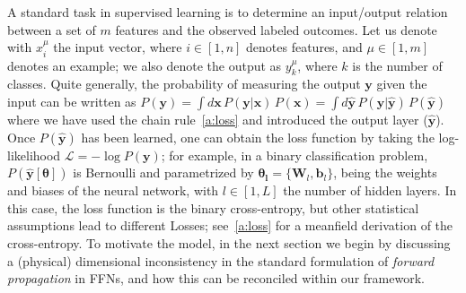 \documentclass{article}
\begin{document}
A standard task in supervised learning is to determine an input/output relation between a set of $m$ features and the observed labeled outcomes. Let us denote with $x^{\mu}_i$ the input vector, where $i \in [1, n]$ denotes features, and $\mu \in [1,m]$ denotes an example; we also denote the output as $y^{\mu}_k$, where $k$ is the number of classes. Quite generally, the probability of measuring the output $\mathbf{y}$ given the input can be written as $P(\mathbf{y}) = \int d\mathbf{x} \, P(\mathbf{y} | \mathbf{x}) \, P(\mathbf{x})  =  \int d \hat{\mathbf{y}} \, P(\mathbf{y} | \hat{\mathbf{y}} ) \, P(\hat{\mathbf{y}})$ where we have used the chain rule~\eqref{a:loss} and introduced the output layer ($\hat{ \mathbf{y}}$). Once $P(\hat{\mathbf{y}})$ has been learned, one can obtain the loss function by taking the log-likelihood $\mathscr{L} = - \log P(\mathbf{y})$; for example, in a binary classification problem, $P(\hat{\mathbf{y}}[\boldsymbol{\theta}])$ is Bernoulli and parametrized by $\boldsymbol{\theta_l} = \{\mathbf{W}_l,\mathbf{ b}_l \}$, being the weights and biases of the neural network, with $l \in [1, L]$ the number of hidden layers. In this case, the loss function is the binary cross-entropy, but other statistical assumptions lead to different Losses; see~\eqref{a:loss} for a meanfield derivation of the cross-entropy. To motivate the model, in the next section we begin by discussing a (physical) dimensional inconsistency in the standard formulation of {\it forward propagation} in FFNs, and how this can be reconciled within our framework.
%
\end{document}
